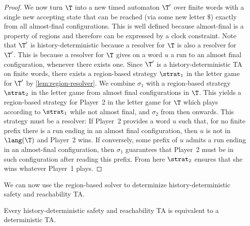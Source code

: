 \begin{proof}
We now turn $\T$ into a new timed automaton $\T'$ over finite words
with a single new accepting state that can be reached (via some new letter $\$$)
exactly from all almost-final configurations.
This is well defined because almost-final is a property of regions and therefore can be expressed by a clock constraint.
Note that $\T'$ is history-deterministic because a resolver for $\T$ is also a resolver for $\T'$. This is because a resolver for $\T$ gives on a word $u$ a run to an almost final configuration, whenever there exists one.
Since $\T'$ is a history-deterministic TA on finite words, there exists a region-based strategy $\strat_1$ in the letter game for $\T'$  by \cref{lem:region-resolver}. 
We combine $\sigma_1$ with a region-based strategy $\strat_2$ in the letter game from almost final configurations in $\T$.
This yields a region-based strategy for Player~2 in the letter game for $\T$ which plays according to $\strat_1$
while not almost final, and $\sigma_2$ from then onwards.
This strategy must be a resolver:
If Player~2 provides a word $u$ such that, for no finite prefix there is a run ending in an almost final configuration,
then $u$ is not in $\lang(\T)$ and Player~2 wins.
If conversely, some prefix of $u$ admits a run ending in an almost-final configuration,
then $\sigma_1$ guarantees that Player~2 must be in such configuration after reading this prefix.
From here $\strat_2$ ensures that she wins whatever Player~1 plays.
\end{proof}


We can now use the region-based solver to determinize history-deterministic safety and reachability TA.

\begin{theorem}
\label{thm:safety-determinisable}
Every history-deterministic safety and reachability TA is equivalent to a deterministic TA.
\end{theorem}

